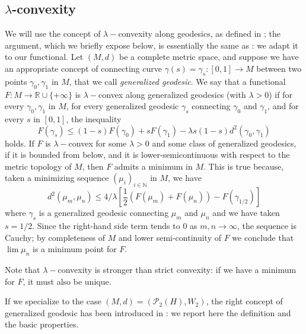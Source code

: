 \documentclass[12pt,a4paper]{article}
\newcommand{\N}{\mathbb{N}}
\newcommand{\R}{\mathbb{R}}
\newcommand{\X}{\mathcal{P}_2(H)}
\theoremstyle{plain}
\theoremstyle{definition}
\begin{document}
\subsection{$\lambda$-convexity}
We will use the concept of $\lambda-$convexity along geodesics, as defined in \cite[Definition 9.2.4]{ambrosio-gigli-savare}; the argument, which we briefly expose below, is essentially the same as \cite[Theorem 4.1]{matthes-plazotta}: we adapt it to our functional.
Let $(M,d)$ be a complete metric space, and suppose we have an appropriate concept of connecting curve $\gamma(s) = \gamma_s: [0,1] \to M$ between two points $\gamma_0, \gamma_1$ in $M$, that we call \emph{generalized geodesic}. We say that a functional $F:M\to \R \cup \{+\infty\}$ is $\lambda-$convex along generalized geodesics (with $\lambda>0$) if for every $\gamma_0, \gamma_1$ in $M$, for every generalized geodesic $\gamma_s$ connecting $\gamma_0$ and $\gamma_1$, and for every $s$ in $[0,1]$, the inequality
\[
F(\gamma_s) \leq (1-s) F(\gamma_0) + s F(\gamma_1) - \lambda s (1-s) d^2(\gamma_0, \gamma_1)
\]
holds. If $F$ is $\lambda-$convex for some $\lambda>0$ and some class of generalized geodesics, if it is bounded from below, and it is lower-semicontinuous with respect to the metric topology of $M$, then $F$ admits a minimum in $M$. This is true because, taken a minimizing sequence $(\mu_i)_{i \in \N}$ in $M$, we have
\[
d^2(\mu_m, \mu_n) \leq 4/\lambda \left[ \frac{1}{2} (F(\mu_m) + F(\mu_n)) - F(\gamma_{1/2})\right]
\]
where $\gamma_s$ is a generalized geodesic connecting $\mu_m$ and $\mu_n$ and we have taken $s=1/2$.
Since the right-hand side term tends to $0$ as $m,n \to \infty$, the sequence is Cauchy; by completeness of $M$ and lower semi-continuity of $F$ we conclude that $\lim \mu_n$ is a minimum point for $F$.

Note that $\lambda-$convexity is stronger than strict convexity: if we have a minimum for $F$, it must also be unique.

If we specialize to the case $(M,d) = (\X, W_2)$, the right concept of generalized geodesic has been introduced in \cite[Definition 9.2.2]{ambrosio-gigli-savare}: we report here the definition and the basic properties.
\end{document}
